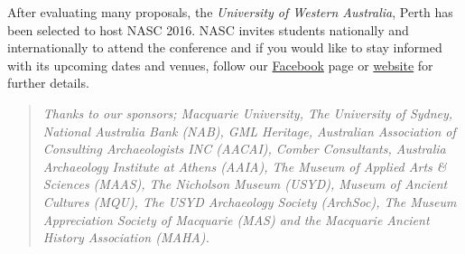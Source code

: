 After evaluating many proposals, the \emph{University of Western Australia}, Perth has been selected to host NASC 2016. NASC invites students nationally and internationally to attend the conference and if you would like to stay informed with its upcoming dates and venues, follow our \href{https://www.facebook.com/nascaustralia}{Facebook} page or \href{http://www.nascaustralia.com/}{website} for further details.

	\blockquote{\textit{Thanks to our sponsors; Macquarie University, The University of Sydney, National Australia Bank (NAB), GML Heritage, Australian Association of Consulting Archaeologists INC (AACAI), Comber Consultants, Australia Archaeology Institute at Athens (AAIA), The Museum of Applied Arts \& Sciences (MAAS), The Nicholson Museum (USYD), Museum of Ancient Cultures (MQU), The USYD Archaeology Society (ArchSoc), The Museum Appreciation Society of Macquarie (MAS) and the Macquarie Ancient History Association (MAHA).}}



	\label{NASC:lastpage}
\closingarticle
